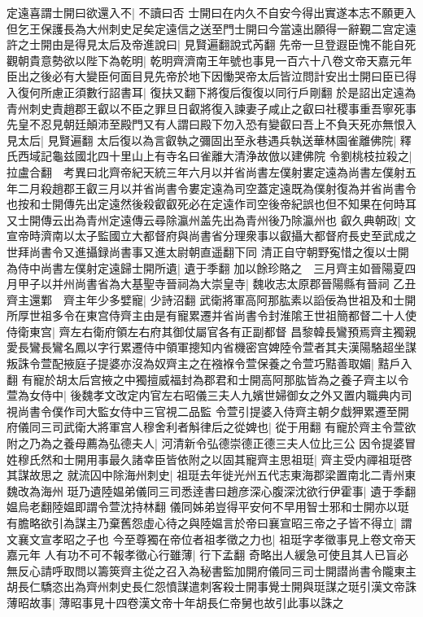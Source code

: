 定遠喜謂士開曰欲還入不|{
	不讀曰否}
士開曰在内久不自安今得出實遂本志不願更入但乞王保護長為大州刺史足矣定遠信之送至門士開曰今當遠出願得一辭覲二宫定遠許之士開由是得見太后及帝進說曰|{
	見賢遍翻說式芮翻}
先帝一旦登遐臣愧不能自死觀朝貴意勢欲以陛下為乾明|{
	乾明齊濟南王年號也事見一百六十八卷文帝天嘉元年}
臣出之後必有大變臣何面目見先帝於地下因慟哭帝太后皆泣問計安出士開曰臣已得入復何所慮正須數行詔書耳|{
	復扶又翻下將復后復復以同行戶剛翻}
於是詔出定遠為青州刺史責趙郡王叡以不臣之罪旦日叡將復入諫妻子咸止之叡曰社稷事重吾寧死事先皇不忍見朝廷顛沛至殿門又有人謂曰殿下勿入恐有變叡曰吾上不負天死亦無恨入見太后|{
	見賢遍翻}
太后復以為言叡執之彌固出至永巷遇兵執送華林園雀離佛院|{
	釋氏西域記龜兹國北四十里山上有寺名曰雀離大清浄故倣以建佛院}
令劉桃枝拉殺之|{
	拉盧合翻　考異曰北齊帝紀天統三年六月以并省尚書左僕射婁定遠為尚書左僕射五年二月殺趙郡王叡三月以并省尚書令婁定遠為司空蓋定遠既為僕射復為并省尚書令也按和士開傳先出定遠然後殺叡叡死必在定遠作司空後帝紀誤也但不知果在何時耳又士開傳云出為青州定遠傳云尋除瀛州盖先出為青州後乃除瀛州也}
叡久典朝政|{
	文宣帝時濟南以太子監國立大都督府與尚書省分理衆事以叡攝大都督府長史至武成之世拜尚書令又進攝録尚書事又進太尉朝直遥翻下同}
清正自守朝野寃惜之復以士開為侍中尚書左僕射定遠歸士開所遺|{
	遺于季翻}
加以餘珍賂之　三月齊主如晉陽夏四月甲子以并州尚書省為大基聖寺晉祠為大崇皇寺|{
	魏收志太原郡晉陽縣有晉祠}
乙丑齊主還鄴　齊主年少多嬖寵|{
	少詩沼翻}
武衛將軍高阿那肱素以謟佞為世祖及和士開所厚世祖多令在東宫侍齊主由是有寵累遷并省尚書令封淮隂王世祖簡都督二十人使侍衛東宫|{
	齊左右衛府領左右府其御仗屬官各有正副都督}
昌黎韓長鸞預焉齊主獨親愛長鸞長鸞名鳳以字行累遷侍中領軍摠知内省機密宫婢陸令萱者其夫漢陽駱超坐謀叛誅令萱配掖庭子提婆亦沒為奴齊主之在襁褓令萱保養之令萱巧黠善取媚|{
	黠戶入翻}
有寵於胡太后宫掖之中獨擅威福封為郡君和士開高阿那肱皆為之養子齊主以令萱為女侍中|{
	後魏孝文改定内官左右昭儀三夫人九嬪世婦御女之外又置内職典内司視尚書令僕作司大監女侍中三官視二品監}
令萱引提婆入侍齊主朝夕戱狎累遷至開府儀同三司武衛大將軍宫人穆舍利者斛律后之從婢也|{
	從于用翻}
有寵於齊主令萱欲附之乃為之養母薦為弘德夫人|{
	河清新令弘德崇德正德三夫人位比三公}
因令提婆冒姓穆氏然和士開用事最久諸幸臣皆依附之以固其寵齊主思祖珽|{
	齊主受内禪祖珽啓其謀故思之}
就流囚中除海州刺史|{
	祖珽去年徙光州五代志東海郡梁置南北二青州東魏改為海州}
珽乃遺陸媪弟儀同三司悉逹書曰趙彦深心腹深沈欲行伊霍事|{
	遺于季翻媪烏老翻陸媪即謂令萱沈持林翻}
儀同姊弟豈得平安何不早用智士邪和士開亦以珽有膽略欲引為謀主乃棄舊怨虛心待之與陸媪言於帝曰襄宣昭三帝之子皆不得立|{
	謂文襄文宣孝昭之子也}
今至尊獨在帝位者祖孝徵之力也|{
	祖珽字孝徵事見上卷文帝天嘉元年}
人有功不可不報孝徵心行雖薄|{
	行下孟翻}
奇略出人緩急可使且其人已盲必無反心請呼取問以籌筴齊主從之召入為秘書監加開府儀同三司士開譛尚書令隴東主胡長仁驕恣出為齊州刺史長仁怨憤謀遣刺客殺士開事覺士開與珽謀之珽引漢文帝誅薄昭故事|{
	薄昭事見十四卷漢文帝十年胡長仁帝舅也故引此事以誅之}
